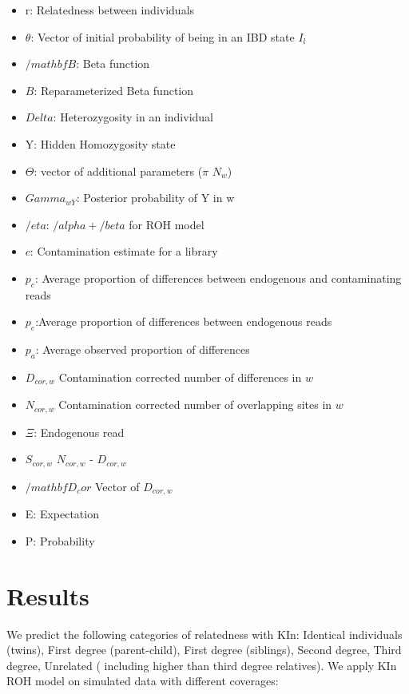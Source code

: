 \documentclass[12pt, letterpaper]{article}
\begin{document}
\begin{itemize}
\item r: Relatedness between individuals
\item $\theta$: Vector of initial probability of being in an IBD state $I_l$
\item $/mathbf{B}$: Beta function
\item $B$: Reparameterized Beta function
\item $Delta$: Heterozygosity in an individual
\item Y: Hidden Homozygosity state
\item $\Theta$: vector of additional parameters ($\pi$ $N_w$)
\item $Gamma_{wY}$: Posterior probability of Y in w
\item $/eta$: $/alpha + /beta$ for ROH model
\item $c$: Contamination estimate for a library
\item $p_c$: Average proportion of differences between endogenous and contaminating reads
\item $p_e$:Average proportion of differences between endogenous reads
\item $p_a$: Average observed proportion of differences
\item $D_{cor,w}$ Contamination corrected number of differences in $w$
\item $N_{cor,w}$ Contamination corrected number of overlapping sites in $w$
\item $\Xi$: Endogenous read
\item $S_{cor,w}$ $N_{cor,w}$ - $D_{cor,w}$
\item $/mathbf{D_cor}$ Vector of $D_{cor,w}$ 
\item E: Expectation
\item P: Probability
\end{itemize}


\section{Results}
We predict the following categories of relatedness with KIn: Identical individuals (twins), First degree (parent-child), First degree (siblings), Second degree, Third degree, Unrelated ( including higher than third degree relatives). We apply KIn ROH model on simulated data with different coverages:
\end{document}
